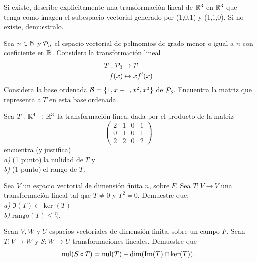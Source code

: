 \documentclass[12pt,a4paper]{book}
\begin{document}
    \begin{ejercicio}
        Si existe, describe explicitamente una transformación lineal de $\mathbb{R}^{3}$
        en $\mathbb{R}^{3}$ que tenga como imagen el subespacio vectorial generado por (1,0,1) y
        (1,1,0). Si no existe, demuestralo.
    \end{ejercicio}

    \begin{ejercicio}
        Sea $n\in\mathbb{N}$ y $\mathcal{P}_{n}$ el espacio vectorial de polinomios
        de grado menor o igual a $n$ con coeficiente en $\mathbb{R}$. Considera la transformación
        lineal
        \begin{align*}
            T:\mathcal{P}_{3}&\to\mathcal{P}\\
            f(x)&\mapsto xf^{\prime}(x)
        \end{align*}
        Considera la base ordenada $\mathcal{B}=\{1,x+1,x^{2},x^{3}\}$ de $\mathcal{P}_{3}$. Encuentra la matriz
        que representa a $T$ en esta base ordenada.
    \end{ejercicio}

    \begin{ejercicio}
        Sea $T:\mathbb{R}^{4}\to\mathbb{R}^{3}$ la transformación lineal dada por el producto de la matriz
        \begin{equation*}
            \begin{pmatrix}
                2 & 1 & 0 & 1\\
                0 & 1 & 0 & 1\\
                2 & 2 & 0 & 2
            \end{pmatrix}
        \end{equation*}
        encuentra (y justifica)\\
        \textit{a)} (1 punto) la nulidad de $T$ y\\
        \textit{b)} (1 punto) el rango de $T$.
    \end{ejercicio}

    \begin{ejercicio}
        Sea $V$ un espacio vectorial de dimensión finita $n$, sobre $F$. Sea $T:V\to V$
        una transformación lineal tal que $T\neq0$ y $T^{2}=0$. Demuestre que:\\
        \textit{a)} $\Im(T)\subset\ker(T)$\\
        \textit{b)} $\text{rango}(T)\leq\frac{n}{2}$.
    \end{ejercicio}

    \begin{ejercicio}
        Sean $V,W$ y $U$ espacios vectoriales de dimensión finita, sobre un campo $F$. Sean $T:V\to W$ y $S:W\to U$ transformaciones lineales.
        Demuestre que
        \begin{equation*}
            \operatorname{nul}(S\circ T)=\operatorname{nul}(T)+\dim(\Im(T)\cap\ker(T)).
        \end{equation*}
    \end{ejercicio}
\end{document}
